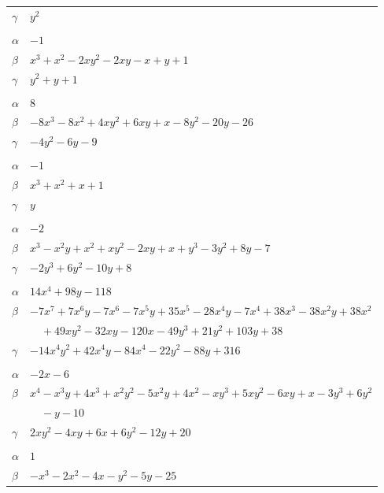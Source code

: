 \documentclass[11pt]{article}
\begin{document}
\begin{longtable}{@{}ll@{}}
$\gamma$ & $y^{2}$\\
\addlinespace[3pt]
\multicolumn{2}{@{}l}{$\{i,j\}=\{1,9\}$, $k_{ij}=2$}\\
$\alpha$ & $-1$\\
$\beta$ & $x^{3}+x^{2}-2xy^{2}-2xy-x+y+1$\\
$\gamma$ & $y^{2}+y+1$\\
\addlinespace[3pt]
\multicolumn{2}{@{}l}{$\{i,j\}=\{1,12\}$, $k_{ij}=3$}\\
$\alpha$ & $8$\\
$\beta$ & $-8x^{3}-8x^{2}+4xy^{2}+6xy+x-8y^{2}-20y-26$\\
$\gamma$ & $-4y^{2}-6y-9$\\
\addlinespace[3pt]
\multicolumn{2}{@{}l}{$\{i,j\}=\{1,13\}$, $k_{ij}=3$}\\
$\alpha$ & $-1$\\
$\beta$ & $x^{3}+x^{2}+x+1$\\
$\gamma$ & $y$\\
\addlinespace[3pt]
\multicolumn{2}{@{}l}{$\{i,j\}=\{2,8\}$, $k_{ij}=2\cdot 3$}\\
$\alpha$ & $-2$\\
$\beta$ & $x^{3}-x^{2}y+x^{2}+xy^{2}-2xy+x+y^{3}-3y^{2}+8y-7$\\
$\gamma$ & $-2y^{3}+6y^{2}-10y+8$\\
\addlinespace[3pt]
\multicolumn{2}{@{}l}{$\{i,j\}=\{2,11\}$, $k_{ij}=2^{4}\cdot 5$}\\
$\alpha$ & $14x^{4}+98y-118$\\
$\beta$ & $-7x^{7}+7x^{6}y-7x^{6}-7x^{5}y+35x^{5}-28x^{4}y-7x^{4}+38x^{3}-38x^{2}y+38x^{2}$\\
 & $\quad +49xy^{2}-32xy-120x-49y^{3}+21y^{2}+103y+38$\\
$\gamma$ & $-14x^{4}y^{2}+42x^{4}y-84x^{4}-22y^{2}-88y+316$\\
\addlinespace[3pt]
\multicolumn{2}{@{}l}{$\{i,j\}=\{2,13\}$, $k_{ij}=2^{3}\cdot 3$}\\
$\alpha$ & $-2x-6$\\
$\beta$ & $x^{4}-x^{3}y+4x^{3}+x^{2}y^{2}-5x^{2}y+4x^{2}-xy^{3}+5xy^{2}-6xy+x-3y^{3}+6y^{2}$\\
 & $\quad -y-10$\\
$\gamma$ & $2xy^{2}-4xy+6x+6y^{2}-12y+20$\\
\addlinespace[3pt]
\multicolumn{2}{@{}l}{$\{i,j\}=\{3,5\}$, $k_{ij}=2^{4}\cdot 5$}\\
$\alpha$ & $1$\\
$\beta$ & $-x^{3}-2x^{2}-4x-y^{2}-5y-25$\\

\end{longtable}
\end{document}
